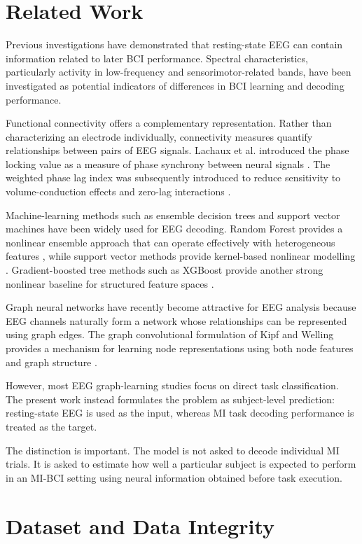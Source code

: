 \documentclass[conference]{IEEEtran}
\begin{document}
\section{Related Work}
Previous investigations have demonstrated that resting-state EEG can contain information related to later BCI performance. Spectral characteristics, particularly activity in low-frequency and sensorimotor-related bands, have been investigated as potential indicators of differences in BCI learning and decoding performance.

Functional connectivity offers a complementary representation. Rather than characterizing an electrode individually, connectivity measures quantify relationships between pairs of EEG signals. Lachaux et al. introduced the phase locking value as a measure of phase synchrony between neural signals \cite{lachaux1999}. The weighted phase lag index was subsequently introduced to reduce sensitivity to volume-conduction effects and zero-lag interactions \cite{vinck2011}.

Machine-learning methods such as ensemble decision trees and support vector machines have been widely used for EEG decoding. Random Forest provides a nonlinear ensemble approach that can operate effectively with heterogeneous features \cite{breiman2001}, while support vector methods provide kernel-based nonlinear modelling \cite{cortes1995}. Gradient-boosted tree methods such as XGBoost provide another strong nonlinear baseline for structured feature spaces \cite{chen2016}.

Graph neural networks have recently become attractive for EEG analysis because EEG channels naturally form a network whose relationships can be represented using graph edges. The graph convolutional formulation of Kipf and Welling provides a mechanism for learning node representations using both node features and graph structure \cite{kipf2017}.

However, most EEG graph-learning studies focus on direct task classification. The present work instead formulates the problem as subject-level prediction: resting-state EEG is used as the input, whereas MI task decoding performance is treated as the target.

The distinction is important. The model is not asked to decode individual MI trials. It is asked to estimate how well a particular subject is expected to perform in an MI-BCI setting using neural information obtained before task execution.

\section{Dataset and Data Integrity}
\end{document}
